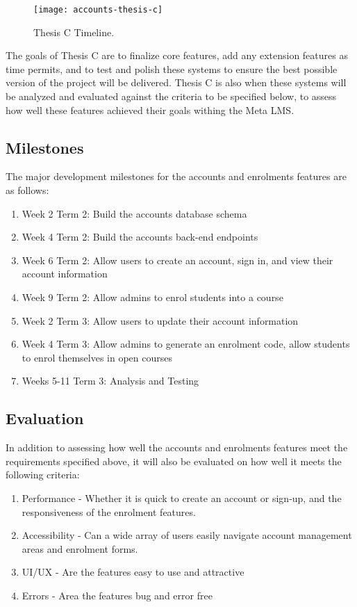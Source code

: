 \begin{figure}[h!]
    \centering
    \texttt{[image: accounts-thesis-c]}
    \caption{Thesis C Timeline.}
\end{figure}
The goals of Thesis C are to finalize core features, add any extension features as time permits, and to test and polish these systems to ensure the best possible version of the project will be delivered. Thesis C is also when these systems will be analyzed and evaluated against the criteria to be specified below, to assess how well these features achieved their goals withing the Meta LMS.

\subsection{Milestones}
The major development milestones for the accounts and enrolments features are as follows:
    \begin{enumerate}
        \item Week 2 Term 2: Build the accounts database schema
        \item Week 4 Term 2: Build the accounts back-end endpoints
        \item Week 6 Term 2: Allow users to create an account, sign in, and view their account information
        \item Week 9 Term 2: Allow admins to enrol students into a course
        \item Week 2 Term 3: Allow users to update their account information
        \item Week 4 Term 3: Allow admins to generate an enrolment code, allow students to enrol themselves in open courses
        \item Weeks 5-11 Term 3: Analysis and Testing
    \end{enumerate}

\subsection{Evaluation}
In addition to assessing how well the accounts and enrolments features meet the requirements specified above, it will also be evaluated on how well it meets the following criteria:
\begin{enumerate}
    \item Performance - Whether it is quick to create an account or sign-up, and the responsiveness of the enrolment features.
    \item Accessibility - Can a wide array of users easily navigate account management areas and enrolment forms.
    \item UI/UX - Are the features easy to use and attractive
    \item Errors - Area the features bug and error free
\end{enumerate}